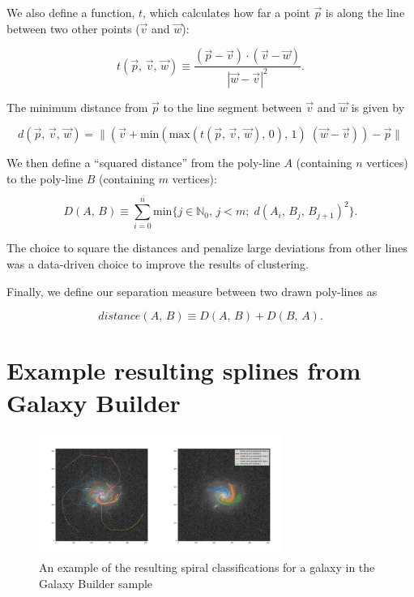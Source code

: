 \documentclass[../main.tex]{subfiles}
\begin{document}
We also define a function, $t$, which calculates how far a point $\vec{p}$ is along the line between two other points ($\vec{v}$ and $\vec{w}$):

\begin{equation}
t(\vec{p},\,\vec{v},\,\vec{w}) \equiv \frac{(\vec{p} - \vec{v})\cdot(\vec{v} - \vec{w})}{|\vec{w} - \vec{v}|^2}.
\end{equation}

The minimum distance from $\vec{p}$ to the line segment between $\vec{v}$ and $\vec{w}$ is given by

\begin{equation}
d(\vec{p},\,\vec{v},\,\vec{w}) = \|\left(\vec{v} + \mathrm{min}(\mathrm{max}(t(\vec{p},\,\vec{v},\,\vec{w}),\, 0),\, 1)\;(\vec{w} - \vec{v})\right) - \vec{p}\|
\end{equation}

We then define a ``squared distance'' from the poly-line $A$ (containing $n$ vertices) to the poly-line $B$ (containing $m$ vertices):

\begin{equation}
D(A,\,B) \equiv \sum_{i = 0}^{n} \mathrm{min}\{j \in \mathbb{N}_0,\, j < m;\; d(A_i,\, B_j,\, B_{j+1})^2\}.
\end{equation}

The choice to square the distances and penalize large deviations from other lines was a data-driven choice to improve the results of clustering.

Finally, we define our separation measure between two drawn poly-lines as

\begin{equation}
distance(A,\,B) \equiv D(A,\,B) + D(B,\,A).
\end{equation}


\section{Example resulting splines from Galaxy Builder}
\label{appendix:exampleSplines}

\begin{figure}
  \includegraphics[width=8cm]{images/montage-subject-21096891.jpg}
  \caption{An example of the resulting spiral classifications for a galaxy in the Galaxy Builder sample}
\end{figure}
\end{document}
